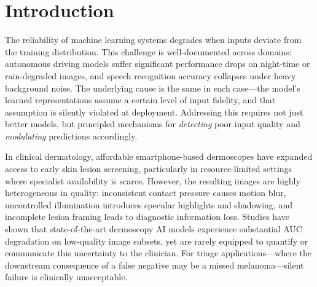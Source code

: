 
\section{Introduction}
\label{sec:intro}

%

The reliability of machine learning systems degrades when inputs deviate from the training distribution.
This challenge is well-documented across domains: autonomous driving models suffer significant performance drops on night-time or rain-degraded images, and speech recognition accuracy collapses under heavy background noise.
The underlying cause is the same in each case—the model's learned representations assume a certain level of input fidelity, and that assumption is silently violated at deployment.
Addressing this requires not just better models, but principled mechanisms for \emph{detecting} poor input quality and \emph{modulating} predictions accordingly.

In clinical dermatology, affordable smartphone-based dermoscopes have expanded access to early skin lesion screening, particularly in resource-limited settings where specialist availability is scarce.
However, the resulting images are highly heterogeneous in quality: inconsistent contact pressure causes motion blur, uncontrolled illumination introduces specular highlights and shadowing, and incomplete lesion framing leads to diagnostic information loss.
Studies have shown that state-of-the-art dermoscopy AI models experience substantial AUC degradation on low-quality image subsets, yet are rarely equipped to quantify or communicate this uncertainty to the clinician.
For triage applications—where the downstream consequence of a false negative may be a missed melanoma—silent failure is clinically unacceptable.

